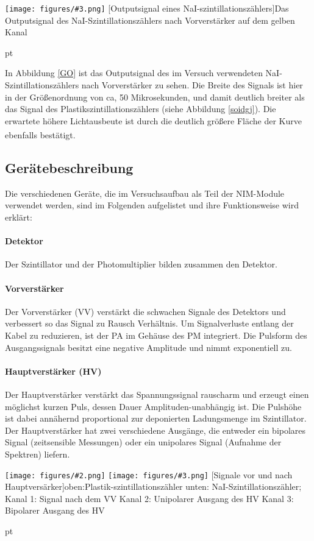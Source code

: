 \documentclass[12pt,listof=totoc]{scrartcl}
\newcommand{\graShort}[4][0.7]{
	\begin{minipage}[h!]{\textwidth}
		\centering
		\texttt{[image: figures/\#3.png]}
		\captionof{figure}[#2]{#4}
	\end{minipage}
	\vskip 30 pt
}
\newcommand{\graTwoShort}[5][0.49]{
	\begin{minipage}[h!]{\textwidth}
		\centering
		\texttt{[image: figures/\#2.png]}
		\texttt{[image: figures/\#3.png]}
		\captionof{figure}[#4]{#5}
	\end{minipage}
	\vskip 30 pt
}
\begin{document}
  \graShort[0.5]{Outputsignal eines NaI-szintillationszählers}{NaI-Szinti}{Das Outputsignal des NaI-Szintillationszählers nach Vorverstärker auf dem gelben Kanal \label{GO}}
  
  In Abbildung \ref{GO} ist das Outputsignal des im Versuch verwendeten NaI-Szintillationszählers nach Vorverstärker zu sehen. Die Breite des Signals ist hier in der Größenordnung von ca, 50 Mikrosekunden, und damit deutlich breiter als das Signal des Plastikszintillationszählers (siehe Abbildung \ref{soidgj}). Die erwartete höhere Lichtausbeute ist durch die deutlich größere Fläche der Kurve ebenfalls bestätigt.\textsuperscript{\cite{staat}}
 \subsection{Gerätebeschreibung \label{Geräte}}
 
 Die verschiedenen Geräte, die im Versuchsaufbau als Teil der NIM-Module verwendet werden, sind im Folgenden aufgelistet und ihre Funktionsweise wird erklärt:
 
 \paragraph{Detektor} Der Szintillator und der Photomultiplier bilden zusammen den Detektor.
 \paragraph{Vorverstärker}
 Der Vorverstärker (VV) verstärkt die schwachen Signale des Detektors und verbessert so
 das Signal zu Rausch Verhältnis. Um Signalverluste entlang der Kabel zu reduzieren, ist der PA im Gehäuse des PM integriert. Die Pulsform des Ausgangssignals besitzt eine negative Amplitude und nimmt exponentiell zu.
 \paragraph{Hauptverstärker (HV)}
 Der Hauptverstärker  verstärkt das Spannungssignal rauscharm und erzeugt einen möglichst kurzen Puls, dessen Dauer Amplituden-unabhängig ist. Die Pulshöhe ist dabei annähernd proportional zur deponierten Ladungsmenge im Szintillator. Der Hauptverstärker hat zwei verschiedene Ausgänge, die entweder ein bipolares Signal (zeitsensible Messungen) oder ein unipolares Signal (Aufnahme der Spektren) liefern.
 
 \graTwoShort[0.5]{Plastik-Verstaerker}{NaI-Verstaerker}{Signale vor und nach Hauptversärker}{oben:Plastik-szintillationszähler unten: NaI-Szintillationszähler; Kanal 1: Signal nach dem VV Kanal 2: Unipolarer Ausgang des HV Kanal 3: Bipolarer Ausgang des HV \label{HV}}
 
\end{document}
